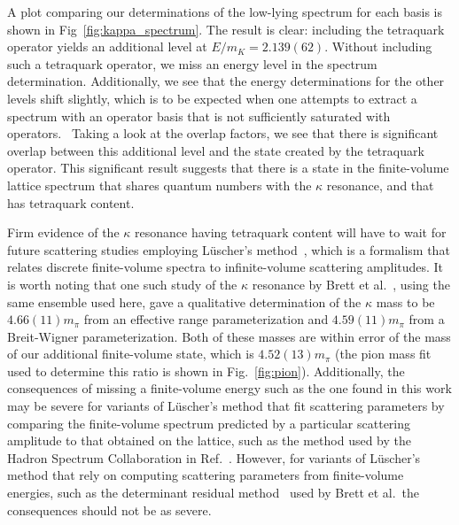 A plot comparing our determinations of the low-lying spectrum for each basis is shown in Fig~\ref{fig:kappa_spectrum}. The result is clear: including the tetraquark operator yields an additional level at $E/m_K = 2.139(62)$. Without including such a tetraquark operator, we miss an energy level in the spectrum determination. Additionally, we see that the energy determinations for the other levels shift slightly, which is to be expected when one attempts to extract a spectrum with an operator basis that is not sufficiently saturated with operators.~\cite{Dudek:2012xn} Taking a look at the overlap factors, we see that there is significant overlap between this additional level and the state created by the tetraquark operator. This significant result suggests that there is a state in the finite-volume lattice spectrum that shares quantum numbers with the $\kappa$ resonance, and that has tetraquark content.

Firm evidence of the $\kappa$ resonance having tetraquark content will have to wait for future scattering studies employing L\"uscher's method~\cite{Luscher:1990ck}, which is a formalism that relates discrete finite-volume spectra to infinite-volume scattering amplitudes. It is worth noting that one such study of the $\kappa$ resonance by Brett et al.~\cite{Brett:2018jqw}, using the same ensemble used here, gave a qualitative determination of the $\kappa$ mass to be $4.66(11)m_\pi$ from an effective range parameterization and $4.59(11)m_\pi$ from  a Breit-Wigner parameterization. Both of these masses are within error of the mass of our additional finite-volume state, which is $4.52(13)m_\pi$ (the pion mass fit used to determine this ratio is shown in Fig.~\ref{fig:pion}). Additionally, the consequences of missing a finite-volume energy such as the one found in this work may be severe for variants of L\"uscher's method that fit scattering parameters by comparing the finite-volume spectrum predicted by a particular scattering amplitude to that obtained on the lattice, such as the method used by the Hadron Spectrum Collaboration in Ref.~\cite{Wilson:2015dqa}. However, for variants of L\"uscher's method that rely on computing scattering parameters from finite-volume energies, such as the determinant residual method~\cite{Morningstar:2017spu} used by Brett et al.\, the consequences should not be as severe.

